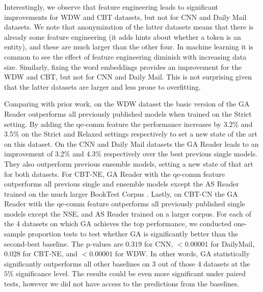 \documentclass[11pt,a4paper]{article}
\begin{document}
Interestingly, we observe that feature engineering leads to significant improvements for WDW and CBT datasets, but not for CNN and Daily Mail datasets. We note that anonymization of the latter datasets means that there is already some feature engineering (it adds hints about whether a token is an entity), and these are much larger than the other four. In machine learning it is common to see the effect of feature engineering diminish with increasing data size. Similarly, fixing the word embeddings provides an improvement for the WDW and CBT, but not for CNN and Daily Mail. This is not surprising given that the latter datasets are larger and less prone to overfitting.

Comparing with prior work, on the WDW dataset the basic version of the GA Reader outperforms all previously published models when trained on the Strict setting. By adding the qe-comm feature the performance increases by 3.2\% and 3.5\% on the Strict and Relaxed settings respectively to set a new state of the art on this dataset. On the CNN and Daily Mail datasets the GA Reader leads to an improvement of 3.2\% and 4.3\% respectively over the best previous single models. They also outperform previous ensemble models, setting a new state of that art for both datasets. For CBT-NE, GA Reader with the qe-comm feature outperforms all previous single and ensemble models except the AS Reader trained on the much larger BookTest Corpus \citep{bajgar2016embracing}. Lastly, on CBT-CN the GA Reader with the qe-comm feature outperforms all previously published single models except the NSE, and AS Reader trained on a larger corpus. For each of the 4 datasets on which GA achieves the top performance, we conducted one-sample proportion tests to test whether GA is significantly better than the second-best baseline. The p-values are $0.319$ for CNN, $<$$0.00001$ for DailyMail, $0.028$ for CBT-NE, and $<$$0.00001$ for WDW. In other words, GA statistically significantly outperforms all other baselines on 3 out of those 4 datasets at the $5\%$ significance level. The results could be even more significant under paired tests, however we did not have access to the predictions from the baselines.

\end{document}
